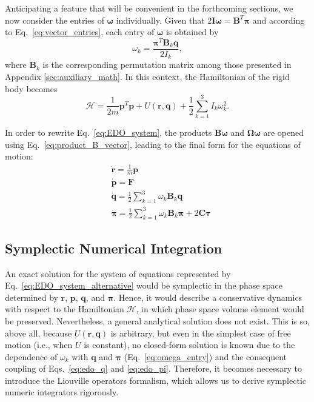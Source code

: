 \documentclass[aip,jcp,reprint,amsmath,amssymb]{revtex4-1}
\newcommand{\mt}[1]{\boldsymbol{\mathbf{#1}}}           %
\newcommand{\vt}[1]{\boldsymbol{\mathbf{#1}}}           %
\newcommand{\tr}[1]{#1^T}                               %
\begin{document}
Anticipating a feature that will be convenient in the forthcoming sections, we now consider the entries of $\vt \omega$ individually. Given that $2{\mt I}{\vt \omega} = \tr{\mt B}{\vt \pi}$ and according to Eq.~\ref{eq:vector_entries}, each entry of $\vt \omega$ is obtained by
\begin{equation}
\label{eq:omega_entry}
\omega_k = \frac{\tr{\vt \pi} {\mt B}_k \vt q}{2 I_k},
\end{equation}
where $\mt B_k$ is the corresponding permutation matrix among those presented in Appendix \ref{sec:auxiliary_math}. In this context, the Hamiltonian of the rigid body becomes
\[
\mathcal{H} = \frac{1}{2m} \tr{\vt p} \vt p + U(\vt r, \vt q) + \frac{1}{2} \sum_{k=1}^3 I_k \omega_k^2.
\]

In order to rewrite Eq.~\ref{eq:EDO_system}, the products $\mt B \vt \omega$ and $\mt \Omega \vt \omega$ are opened using Eq.~\ref{eq:product_B_vector}, leading to the final form for the equations of motion:
\begin{subequations}
\label{eq:EDO_system_alternative}
\begin{align}
&\dot{\vt r} = \frac{1}{m} \vt p \\
&\dot{\vt p} = \vt F \\
&\dot{\vt q} = \frac{1}{2} \sum_{k=1}^3 \omega_k {\mt B}_k \vt q \label{eq:edo_q} \\
&\dot{\vt \pi} = \frac{1}{2} \sum_{k=1}^3 \omega_k {\mt B}_k \vt \pi + 2 \mt C \vt \tau \label{eq:edo_pi}
\end{align}
\end{subequations}

\subsection{Symplectic Numerical Integration}  
\label{symplectic}
An exact solution for the system of equations represented by Eq.~\ref{eq:EDO_system_alternative} would be symplectic in the phase space determined by $\vt r$, $\vt p$, $\vt q$, and $\vt \pi$. Hence, it would describe a conservative dynamics with respect to the Hamiltonian $\mathcal{H}$, in which phase space volume element would be preserved. Nevertheless, a general analytical solution does not exist. This is so, above all, because $U(\vt r, \vt q)$ is arbitrary, but even in the simplest case of free motion (i.e., when $U$ is constant), no closed-form solution is known due to the dependence of $\omega_k$ with $\vt q$ and $\vt \pi$ (Eq.~\ref{eq:omega_entry}) and the consequent coupling of Eqs.~\ref{eq:edo_q} and \ref{eq:edo_pi}. Therefore, it becomes necessary to introduce the Liouville operators formalism, which allows us to derive symplectic numeric integrators rigorously.
\end{document}
